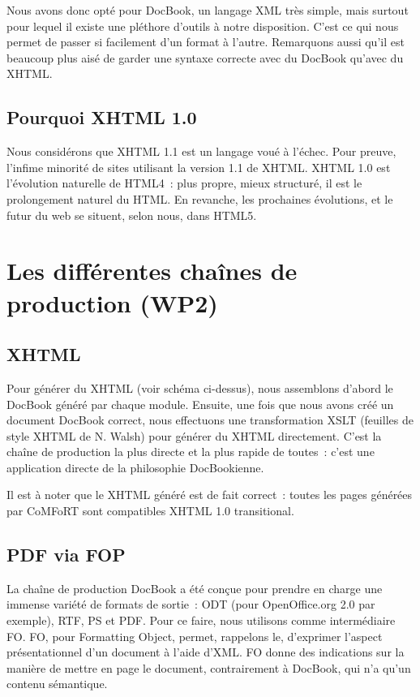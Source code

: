 \documentclass[final,11pt,a4paper,twoside,titlepage]{article}
\newcommand{\p}{\vspace{0.3em}}
\begin{document}
{      Nous avons donc opté pour DocBook, un langage XML très simple, mais
      surtout pour lequel il existe une pléthore d'outils à notre disposition.
      C'est ce qui nous permet de passer si facilement d'un format à l'autre.
      Remarquons aussi qu'il est beaucoup plus aisé de garder une syntaxe
      correcte avec du DocBook qu'avec du XHTML. \p

    \subsection{Pourquoi XHTML 1.0}
      Nous considérons que XHTML 1.1 est un langage voué à l'échec. Pour preuve,
      l'infime minorité de sites utilisant la version 1.1 de XHTML. XHTML 1.0
      est l'évolution naturelle de HTML4~: plus propre, mieux structuré, il est
      le prolongement naturel du HTML. En revanche, les prochaines évolutions,
      et le futur du web se situent, selon nous, dans HTML5.

  \section{Les différentes chaînes de production (WP2)}
    \subsection{XHTML}
      Pour générer du XHTML (voir schéma ci-dessus), nous assemblons d'abord le
      DocBook généré par chaque module. Ensuite, une fois que nous avons créé un
      document DocBook correct, nous effectuons une transformation XSLT
      (feuilles de style XHTML de N. Walsh) pour générer du XHTML directement.
      C'est la chaîne de production la plus directe et la plus rapide de
      toutes~: c'est une application directe de la philosophie DocBookienne.

      Il est à noter que le XHTML généré est de fait correct~: toutes les pages
      générées par CoMFoRT sont compatibles XHTML 1.0 transitional.

    \subsection{PDF via FOP}
      La chaîne de production DocBook a été conçue pour prendre en charge une
      immense variété de formats de sortie~: ODT (pour OpenOffice.org 2.0 par
      exemple), RTF, PS et PDF. Pour ce faire, nous utilisons comme
      intermédiaire FO. FO, pour Formatting Object, permet, rappelons le,
      d'exprimer l'aspect présentationnel d'un document à l'aide d'XML. FO donne
      des indications sur la manière de mettre en page le document,
      contrairement à DocBook, qui n'a qu'un contenu sémantique. \p

}
\end{document}
